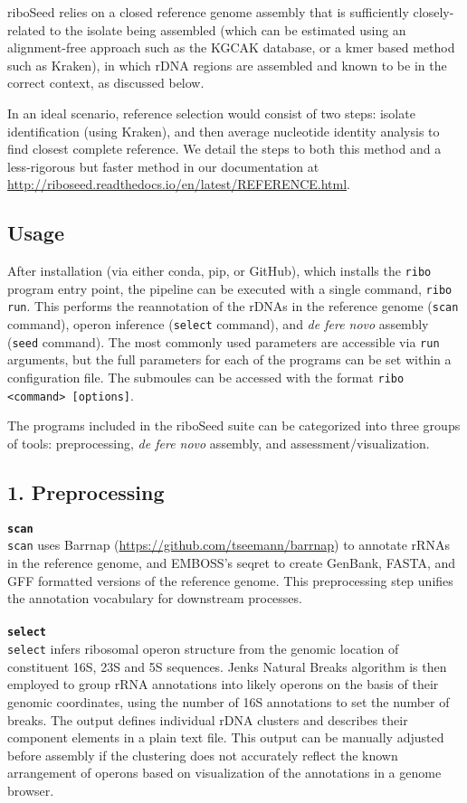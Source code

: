 \documentclass[a4,center,fleqn]{NAR}
\begin{document}
riboSeed relies on a closed reference genome assembly that is sufficiently closely-related to the isolate being assembled (which can be estimated using an alignment-free approach such as the KGCAK database\cite{Wang2015b}, or a kmer based method such as Kraken\cite{Wood2014}), in which rDNA regions are assembled and known to be in the correct context, as discussed below.

In an ideal scenario, reference selection would consist of two steps:  isolate identification (using Kraken), and then average nucleotide identity analysis to find closest complete reference. We detail the steps to both this method and a less-rigorous but faster method in our documentation at \url{http://riboseed.readthedocs.io/en/latest/REFERENCE.html}.

\subsection*{Usage}
After installation (via either conda, pip, or GitHub), which installs the \texttt{ribo} program entry point, the pipeline can be executed with a single command, \texttt{ribo run}. This performs the reannotation of the rDNAs in the reference genome (\texttt{scan} command), operon inference (\texttt{select} command), and \textit{de fere novo} assembly (\texttt{seed} command).  The most commonly used parameters are accessible via \texttt{run} arguments, but the full parameters for each of the programs can be set within a configuration file. The submoules can be accessed with the format \texttt{ribo <command> [options]}.

The programs included in the riboSeed suite can be categorized into three groups of tools: preprocessing, \textit{de fere novo} assembly, and assessment/visualization.

\subsection*{1. Preprocessing}

\textbf{\texttt{scan}}\\
\texttt{scan} uses Barrnap (\url{https://github.com/tseemann/barrnap}) to annotate rRNAs in the reference genome, and EMBOSS's seqret\cite{Rice2000a} to create GenBank, FASTA, and GFF formatted versions of the reference genome. This preprocessing step unifies the annotation vocabulary for downstream processes.\\
\\
\textbf{\texttt{select}}\\
\texttt{select} infers ribosomal operon structure from the genomic location of constituent 16S, 23S and 5S sequences. Jenks Natural Breaks algorithm is then employed to group rRNA annotations into likely operons on the basis of their genomic coordinates, using the number of 16S annotations to set the number of breaks. The output defines individual rDNA clusters and describes their component elements in a plain text file. This output can be manually adjusted before assembly if the clustering does not accurately reflect the known arrangement of operons based on visualization of the annotations in a genome browser.
\end{document}
